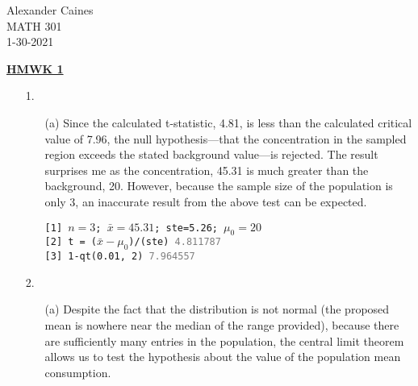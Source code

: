 \documentclass[12pt]{article}
\begin{document}
\vspace{1.0 \baselineskip}

\begin{flushright}
	Alexander Caines\\
	MATH 301\\
	1-30-2021\\
\end{flushright}

\begin{center}
	\textbf{\underline{HMWK 1}}
\end{center}


\begin{enumerate}
	\item[1.]
		\begin{enumerate}
			\item[(a)] Since the calculated t-statistic, 4.81, is less than the calculated critical value 
				of 7.96, the null hypothesis---that the concentration in the sampled region exceeds the stated
				 background value---is rejected. The result surprises me as the concentration, 45.31 is much greater 
				 than the background, 20. However, because the sample size of the population is only 3, an inaccurate result from the above test can be expected.
				 \begin{tcolorbox}[colback=white, title=Work, coltitle=white]
					 \texttt{[1] $n=3$; $\bar{x} = 45.31$; ste=5.26; $\mu_0 = 20$ }\\
					 \texttt{[2] t = ($\bar{x}-\mu_0$)/(ste) \textcolor{gray}{4.811787}}\\
					 \texttt{[3] 1-qt(0.01, 2) \textcolor{gray}{7.964557}}\\
				 \end{tcolorbox}

		\end{enumerate}
	\item[2.]
		\begin{enumerate}
		 	\item[(a)] Despite the fact that the distribution 
				is not normal (the proposed mean is nowhere near the median of the range provided),
				because there are sufficiently 
				many entries in the population, the central 
				limit theorem allows us to test the hypothesis 
				about the value of the population mean consumption.


\end{enumerate}
\end{enumerate}
\end{document}
